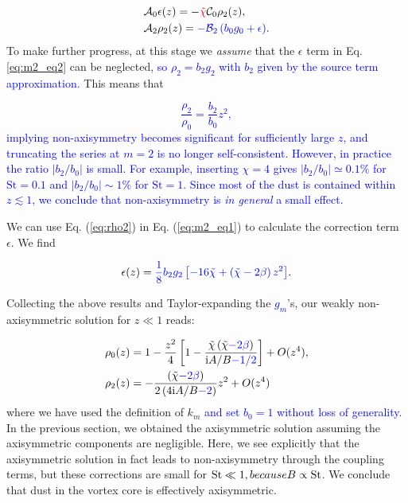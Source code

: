 \documentclass[apj]{emulateapj}
\def\blue#1{\textcolor{blue}{#1}}
\def\red#1{\textcolor{red}{#1}}
\newcommand{\Eq}[1]{Eq. (\ref{#1})}
\newcommand{\eq}[1]{\Eq{#1}}
\newcommand{\beq}{\begin{equation}}
\newcommand{\eeq}{\end{equation}}
\newcommand{\tilchi}{\tilde\chi}
\newcommand{\St}{{\rm St}}
\begin{document}
\begin{align}
&\mathcal{A}_0\epsilon(z) = -\red{\tilchi}\mathcal{C}_0\rho_2(z),\label{eq:m2_eq1}\\
&\mathcal{A}_2\rho_2(z)   = \blue{-\mathcal{B}_2\left(b_0g_0 + \epsilon\right)}.\label{eq:m2_eq2}
\end{align}
To make further progress, at this stage we \emph{assume} that the
$\epsilon$ term in Eq. \ref{eq:m2_eq2} can be neglected\blue{, so $\rho_2 = b_2 g_2$ with $b_2$ given by the source term approximation.} 
This means that  

\blue{
\beq\label{eq:rho2}
\frac{\rho_2}{\rho_0} = \frac{b_2}{b_0}z^2,
\eeq
}
\blue{
implying non-axisymmetry becomes significant for sufficiently large $z$, 
and truncating the series at $m=2$ is no longer self-consistent. 
However, in practice the ratio $|b_2/b_0|$ is small. 
For example, inserting $\chi=4$ gives $|b_2/b_0|\simeq0.1\%$ for
$\mathrm{St}=0.1$ and $|b_2/b_0|\sim 1\%$ for $\mathrm{St}=1$. Since
most of the dust is contained within $z\lesssim 1$, we conclude that
non-axisymmetry is {\it in general} a small effect.}

We can use \eq{eq:rho2} in \eq{eq:m2_eq1} to
calculate the correction term $\epsilon$. We find

\beq
\epsilon(z) = \blue{\frac{1}{8}b_2g_2\left[-16\tilchi+\left(\tilchi - 2\beta\right)z^2\right]}.
\eeq

Collecting the above results and Taylor-expanding the \blue{$g_m$}'s, our
weakly non-axisymmetric solution for $z\ll 1$ reads:

\begin{align}
&\rho_0(z) =1 -  \frac{z^2}{4}\left[1-\frac{\tilchi\left(\tilchi \blue{- 2\beta}\right)}{\mathrm{i}A/B \blue{- 1/2}}\right]+ O(z^4),\\
&\rho_2(z) =-\frac{\left(\tilchi \blue{- 2\beta}\right)}{2\left(4\mathrm{i}A/B \blue{- 2}\right)}z^2+O(z^4)
\end{align}
where we have used the definition of $k_m$ \blue{and set $b_0=1$
  without loss of generality}. %
In the previous section, we obtained the axisymmetric solution
assuming the axisymmetric components are negligible. 
Here, we see explicitly that the axisymmetric solution in fact leads
to non-axisymmetry through the coupling terms, but these corrections
are small for $\St \ll 1, because B \propto \St$. We conclude that dust in the vortex core is effectively axisymmetric.
\end{document}
